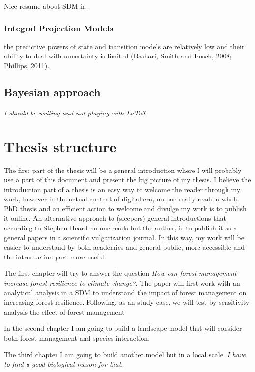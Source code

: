Nice resume about SDM in \citet{Moran-Ordonez2016}.

\subsubsection{Integral Projection Models}

the predictive powers of state and transition models are relatively low and their ability to deal with uncertainty is limited (Bashari, Smith and Bosch, 2008; Phillips, 2011).

\subsection{Bayesian approach}

\textit{I should be writing and not playing with \LaTeX}

\section{Thesis structure}

The first part of the thesis will be a general introduction where I will probably use a part of this document and present the big picture of my thesis.
I believe the introduction part of a thesis is an easy way to welcome the reader through my work, however in the actual context of digital era, no one really reads a whole PhD thesis and an efficient action to welcome and divulge my work is to publish it online.
An alternative approach to (sleepers) general introductions that, according to Stephen Heard\footnotemark{} no one reads but the author, is to publish it as a general papers in a scientific vulgarization journal.
In this way, my work will be easier to understand by both academics and general public, more accessible and the introduction part more useful.

The first chapter will try to answer the question \textit{How can forest management increase forest resilience to climate change?}.
The paper will first work with an analytical analysis in a SDM to understand the impact of forest management on increasing forest resilience.
Following, as an study case, we will test by sensitivity analysis the effect of forest management

In the second chapter I am going to build a landscape model that will consider both forest management and species interaction.

The third chapter I am going to build another model but in a local scale. \textit{I have to find a good biological reason for that}.

